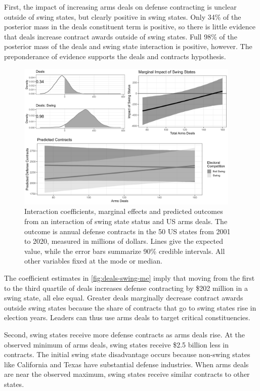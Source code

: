 \documentclass[12pt]{article}
\begin{document}
First, the impact of increasing arms deals on defense contracting is unclear outside of swing states, but clearly positive in swing states. 
Only 34\% of the posterior mass in the deals constituent term is positive, so there is little evidence that deals increase contract awards outside of swing states. 
Full 98\% of the posterior mass of the deals and swing state interaction is positive, however. 
The preponderance of evidence supports the deals and contracts hypothesis.


\begin{figure}[htpb]
	\centering
		\includegraphics[width=0.95\textwidth]{../figures/deals-swing-me.png}
	\caption{Interaction coefficients, marginal effects and predicted outcomes from an interaction of swing state status and US arms deals. The outcome is annual defense contracts in the 50 US states from 2001 to 2020, measured in millions of dollars. Lines give the expected value, while the error bars summarize 90\% credible intervals. All other variables fixed at the mode or median.}
	\label{fig:deals-swing-me}
\end{figure}


The coefficient estimates in \autoref{fig:deals-swing-me} imply that moving from the first to the third quartile of deals increases defense contracting by \$202 million in a swing state, all else equal. 
Greater deals marginally decrease contract awards outside swing states because the share of contracts that go to swing states rise in election years. 
Leaders can thus use arms deals to target critical constituencies.


Second, swing states receive more defense contracts as arms deals rise. 
At the observed minimum of arms deals, swing states receive \$2.5 billion less in contracts.
The initial swing state disadvantage occurs because non-swing states like California and Texas have substantial defense industries.
When arms deals are near the observed maximum, swing states receive similar contracts to other states. 
\end{document}

